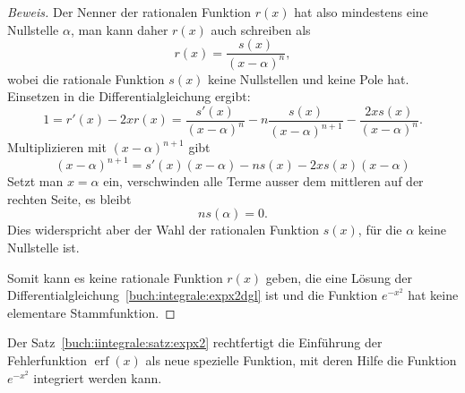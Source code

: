 \begin{proof}[Beweis]
Der Nenner der rationalen Funktion $r(x)$ hat also mindestens eine Nullstelle
$\alpha$, man kann daher $r(x)$ auch schreiben als
\[
r(x) = \frac{s(x)}{(x-\alpha)^n},
\]
wobei die rationale Funktion $s(x)$ keine Nullstellen und keine Pole hat.
Einsetzen in die Differentialgleichung ergibt:
\[
1
=
r'(x) -2xr(x)
=
\frac{s'(x)}{(x-\alpha)^n}
-n
\frac{s(x)}{(x-\alpha)^{n+1}}
-
\frac{2xs(x)}{(x-\alpha)^n}.
\]
Multiplizieren mit $(x-\alpha)^{n+1}$ gibt
\[
(x-\alpha)^{n+1}
=
s'(x)(x-\alpha)
-
ns(x)
-
2xs(x)(x-\alpha)
\]
Setzt man $x=\alpha$ ein, verschwinden alle Terme ausser dem mittleren
auf der rechten Seite, es bleibt
\[
ns(\alpha) = 0.
\]
Dies widerspricht aber der Wahl der rationalen Funktion $s(x)$, für die
$\alpha$ keine Nullstelle ist.

Somit kann es keine rationale Funktion $r(x)$ geben, die eine Lösung der
Differentialgleichung~\eqref{buch:integrale:expx2dgl} ist und
die Funktion $e^{-x^2}$ hat keine elementare Stammfunktion.
\end{proof}

Der Satz~\ref{buch:iintegrale:satz:expx2} rechtfertigt die Einführung 
der Fehlerfunktion $\operatorname{erf}(x)$ als neue spezielle Funktion,
mit deren Hilfe die Funktion $e^{-x^2}$ integriert werden kann.



